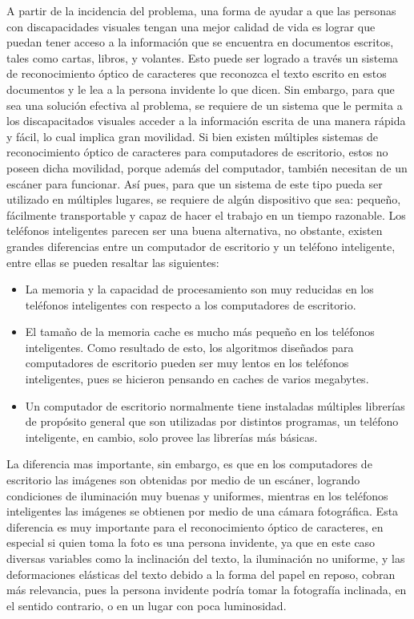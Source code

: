 \documentclass[a4paper, 11pt, oneside]{article}
\begin{document}
	A partir de la incidencia del problema, una forma de ayudar a que las personas con discapacidades visuales tengan una mejor calidad de vida es lograr que puedan tener acceso a la información que se encuentra en documentos escritos, tales como cartas, libros, y volantes. Esto puede ser logrado a través un sistema de reconocimiento óptico de caracteres que reconozca el texto escrito en estos documentos y le lea a la persona invidente lo que dicen. Sin embargo, para que sea una solución efectiva al problema, se requiere de un sistema que le permita a los discapacitados visuales acceder a la información escrita de una manera rápida y fácil, lo cual implica gran movilidad. Si bien existen múltiples sistemas de reconocimiento óptico de caracteres para computadores de escritorio, estos no poseen dicha movilidad, porque además del computador, también necesitan de un escáner para funcionar. Así pues, para que un sistema de este tipo pueda ser utilizado en múltiples lugares, se requiere de algún dispositivo que sea: pequeño, fácilmente transportable y capaz de hacer el trabajo en un tiempo razonable. Los teléfonos inteligentes parecen ser una buena alternativa, no obstante, existen grandes diferencias entre un computador de escritorio y un teléfono inteligente, entre ellas se pueden resaltar las siguientes:
	
	\begin{itemize}
	
	\item La memoria y la capacidad de procesamiento son muy reducidas en los teléfonos inteligentes con respecto a los computadores de escritorio.

	\item El tamaño de la memoria cache es mucho más pequeño en los teléfonos inteligentes. Como resultado de esto, los algoritmos diseñados para computadores de escritorio pueden ser muy lentos en los teléfonos inteligentes, pues se hicieron pensando en caches de varios megabytes.

	\item Un computador de escritorio normalmente tiene instaladas múltiples librerías de propósito general que son utilizadas por distintos programas, un teléfono inteligente, en cambio, solo provee las librerías más básicas.

	\end{itemize}

	La diferencia mas importante, sin embargo, es que en los computadores de escritorio las imágenes son obtenidas por medio de un escáner, logrando condiciones de iluminación muy buenas y uniformes, mientras en los teléfonos inteligentes las imágenes se obtienen por medio de una cámara fotográfica. Esta diferencia es muy importante para el reconocimiento óptico de caracteres, en especial si quien toma la foto es una persona invidente, ya que en este caso diversas variables como la inclinación del texto, la iluminación no uniforme, y las deformaciones elásticas del texto debido a la forma del papel en reposo, cobran más relevancia, pues la persona invidente podría tomar la fotografía inclinada, en el sentido contrario, o en un lugar con poca luminosidad.
\end{document}
